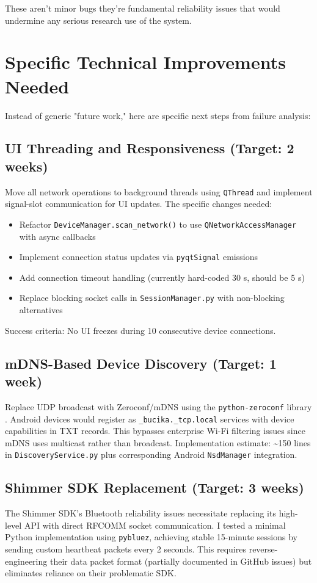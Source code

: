 These aren't minor bugs \textemdash they're fundamental reliability issues that would undermine any serious research
use of the system.


\section{Specific Technical Improvements Needed}

Instead of generic "future work," here are specific next steps from failure analysis:

\subsection{UI Threading and Responsiveness (Target: 2 weeks)}
Move all network operations to background threads using \texttt{QThread} and implement signal-slot communication for UI updates. The specific changes needed:
\begin{itemize}
    \item Refactor \texttt{DeviceManager.scan\_network()} to use \texttt{QNetworkAccessManager} with async callbacks
    \item Implement connection status updates via \texttt{pyqtSignal} emissions
    \item Add connection timeout handling (currently hard-coded 30 s, should be 5 s)
    \item Replace blocking socket calls in \texttt{SessionManager.py} with non-blocking alternatives
\end{itemize}
Success criteria: No UI freezes during 10 consecutive device connections.

\subsection{mDNS-Based Device Discovery (Target: 1 week)}
Replace UDP broadcast with Zeroconf/mDNS using the \texttt{python-zeroconf} library \cite{ref19}. Android devices would register as \texttt{\_bucika.\_tcp.local} services with device capabilities in TXT records. This bypasses enterprise Wi-Fi filtering issues since mDNS uses multicast rather than broadcast. Implementation estimate: \textasciitilde{}150 lines in \texttt{DiscoveryService.py} plus corresponding Android \texttt{NsdManager} integration.

\subsection{Shimmer SDK Replacement (Target: 3 weeks)}
The Shimmer SDK's Bluetooth reliability issues necessitate replacing its high-level API with direct RFCOMM socket communication. I tested a minimal Python implementation using \texttt{pybluez}, achieving stable 15-minute sessions by sending custom heartbeat packets every 2 seconds. This requires reverse-engineering their data packet format (partially documented in GitHub issues) but eliminates reliance on their problematic SDK.

